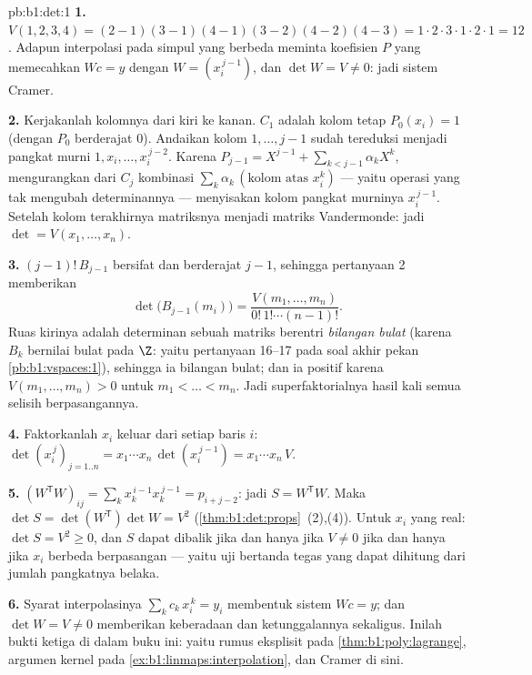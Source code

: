 \begin{solution}{pb:b1:det:1}
\textbf{1.} $V(1,2,3,4) = (2-1)(3-1)(4-1)(3-2)(4-2)(4-3) = 1
\cdot 2\cdot 3\cdot 1\cdot 2\cdot 1 = 12$. Adapun interpolasi pada
simpul yang berbeda meminta koefisien $P$ yang memecahkan $W c =
y$ dengan $W = (x_i^{\,j-1})$, dan $\det W = V \neq 0$: jadi sistem
Cramer.

\textbf{2.} Kerjakanlah kolomnya dari kiri ke kanan. $C_1$
adalah kolom tetap $P_0(x_i) = 1$ (dengan $P_0$  berderajat
$0$). Andaikan kolom $1, \dots, j-1$ sudah tereduksi
menjadi pangkat murni $1, x_i, \dots, x_i^{\,j-2}$. Karena $P_{j-1}
= X^{j-1} + \sum_{k < j-1}\alpha_k X^k$, mengurangkan dari $C_j$
kombinasi $\sum_k \alpha_k\,(\text{kolom atas } x_i^k)$
--- yaitu operasi yang tak mengubah determinannya --- menyisakan
kolom pangkat murninya $x_i^{\,j-1}$. Setelah kolom terakhirnya
matriksnya menjadi matriks Vandermonde: jadi $\det = V(x_1, \dots, x_n)$.

\textbf{3.}  $(j-1)!\,B_{j-1}$ bersifat  dan
berderajat $j - 1$, sehingga pertanyaan 2 memberikan
\[
\det\bigl(B_{j-1}(m_i)\bigr)
= \frac{V(m_1, \dots, m_n)}{0!\,1!\cdots(n-1)!} .
\]
Ruas kirinya adalah determinan sebuah matriks berentri \emph{bilangan bulat}
(karena $B_k$ bernilai bulat pada $\Z$: yaitu pertanyaan 16--17 pada
soal akhir pekan \cref{pb:b1:vspaces:1}), sehingga ia bilangan bulat;
dan ia positif karena $V(m_1, \dots, m_n) > 0$ untuk $m_1 <
\dots < m_n$. Jadi superfaktorialnya  hasil kali semua
selisih berpasangannya.

\textbf{4.} Faktorkanlah $x_i$ keluar dari setiap baris $i$:
$\det(x_i^{\,j})_{j = 1..n} = x_1\cdots x_n\,
\det(x_i^{\,j-1}) = x_1\cdots x_n\,V$.

\textbf{5.} $(W^{\mathsf T}W)_{ij} = \sum_k x_k^{\,i-1}
x_k^{\,j-1} = p_{i+j-2}$: jadi $S = W^{\mathsf T}W$. Maka $\det S =
\det(W^{\mathsf T})\det W = V^2$
(\cref{thm:b1:det:props}~(2),(4)). Untuk $x_i$ yang real: $\det S = V^2
\geq 0$, dan $S$ dapat dibalik jika dan hanya jika $V \neq 0$ jika dan hanya jika $x_i$
berbeda berpasangan --- yaitu uji bertanda tegas yang dapat dihitung dari
jumlah pangkatnya belaka.

\textbf{6.} Syarat interpolasinya $\sum_{k}
c_k\,x_i^{\,k} = y_i$ membentuk sistem $Wc = y$; dan $\det W = V \neq
0$ memberikan keberadaan dan ketunggalannya sekaligus. Inilah bukti
ketiga di dalam buku ini: yaitu rumus eksplisit pada
\cref{thm:b1:poly:lagrange}, argumen kernel pada
\cref{ex:b1:linmaps:interpolation}, dan Cramer di sini.


\end{solution}
